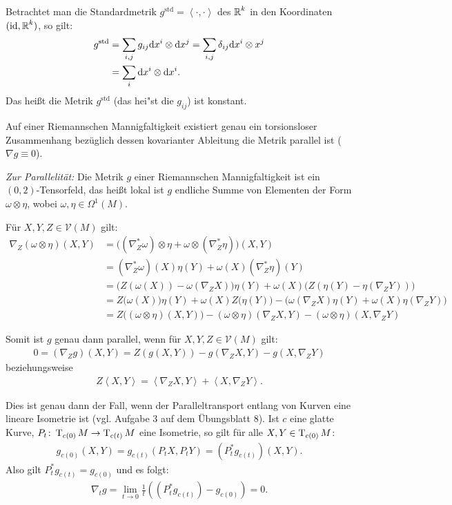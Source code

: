 Betrachtet man die Standardmetrik $g^{\text{std}} = \left<\cdot,\cdot\right>$ des $\operatorname{\mathbb{R}}^k$ in den Koordinaten $(\operatorname{id}, \operatorname{\mathbb{R}}^k)$, so gilt:
\begin{align*}
  g^{\text{std}} & = \sum_{i,j} g_{ij} \mathrm{d} x^i \otimes \mathrm{d} x^j = \sum_{i,j} \delta_{ij} \mathrm{d} x^i \otimes x^j\\
  & = \sum_i \mathrm{d} x^i \otimes \mathrm{d} x^i.
\end{align*}
Das heißt die Metrik $g^{\text{std}}$ (das hei"st die $g_{ij}$) ist konstant.

\begin{Satz} \label{satz-7-12}
  Auf einer Riemannschen Mannigfaltigkeit existiert genau ein torsionsloser Zusammenhang bezüglich dessen kovarianter Ableitung die Metrik parallel ist ($\nabla g \equiv 0$).
\end{Satz}

\emph{Zur Parallelität:} Die Metrik $g$ einer Riemannschen Mannigfaltigkeit ist ein $(0,2)$-Tensorfeld, das heißt lokal ist $g$ endliche Summe von Elementen der Form $\omega \otimes \eta$, wobei $\omega, \eta \in \Omega^1(M)$.

Für $X,Y,Z \in \mathcal V(M)$ gilt:
\begin{align*}
  \nabla_Z(\omega \otimes \eta)(X,Y) & = \big((\nabla^{*}_Z\omega) \otimes \eta + \omega \otimes (\nabla^{*}_Z \eta)\big)(X,Y)\\
& = (\nabla^{*}_Z \omega)(X)\eta(Y) + \omega(X)(\nabla^{*}_Z \eta)(Y)\\
& = \big(Z(\omega(X)) - \omega(\nabla_ZX)\big)\eta(Y) + \omega(X)\big(Z(\eta(Y)-\eta(\nabla_ZY))\big)\\
& = Z\big(\omega(X)\big)\eta(Y) + \omega(X)Z\big(\eta(Y)\big) - \big(\omega(\nabla_ZX)\eta(Y) + \omega(X)\eta(\nabla_ZY)\big)\\
& = Z\big((\omega \otimes \eta)(X,Y)\big) - (\omega \otimes \eta)(\nabla_ZX,Y) - (\omega \otimes \eta)(X,\nabla_Z Y)
\end{align*}

Somit ist $g$ genau dann parallel, wenn für $X,Y,Z \in \mathcal V(M)$ gilt:
\begin{align*}
  0 = (\nabla_Z g)(X,Y) = Z(g(X,Y)) - g(\nabla_ZX,Y) - g(X,\nabla_ZY)
\end{align*}
beziehungsweise
\begin{align*}
  Z\left<X,Y\right> = \left<\nabla_ZX,Y\right> + \left<X,\nabla_ZY\right>.
\end{align*}

Dies ist genau dann der Fall, wenn der Paralleltransport entlang von Kurven eine lineare Isometrie ist (vgl. Aufgabe 3 auf dem Übungsblatt 8).
Ist $c$ eine glatte Kurve, $P_t \colon \operatorname{T}_{c(0)}M \to \operatorname{T}_{c(t)}M$ eine Isometrie, so gilt für alle $X,Y \in \operatorname{T}_{c(0)}M$: 
\begin{align*}
  g_{c(0)}(X,Y) = g_{c(t)}(P_tX,P_tY) = (P^{*}_tg_{c(t)})(X,Y).
\end{align*}
Also gilt $P_t^{*} g_{c(t)} = g_{c(0)}$ und es folgt:
\begin{align*}
  \nabla_t g = \lim_{t \to 0}\frac{1}{t} \left( (P_t^{*}g_{c(t)}) - g_{c(0)} \right) = 0.
\end{align*}

